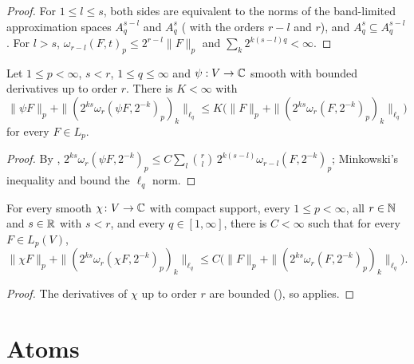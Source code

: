 \begin{proof}
\leanok
For $1 \leq l \leq s$, both sides are equivalent to the norms of the band-limited approximation
spaces $A^{s-l}_q$ and $A^s_q$ ( with the orders $r - l$ and $r$), and
$A^s_q \subseteq A^{s-l}_q$. For $l > s$, $\omega_{r-l}(F, t)_p \leq 2^{r-l} \|F\|_p$ and
$\sum_k 2^{k(s-l)q} < \infty$.
\end{proof}

\begin{theorem}
\label{thm:multipliers}
\leanok
{}
Let $1 \leq p < \infty$, $s < r$, $1 \leq q \leq \infty$ and $\psi : V \to \mathbb{C}$ smooth with bounded
derivatives up to order $r$. There is $K < \infty$ with
\[
  \|\psi F\|_p + \|(2^{ks} \omega_r(\psi F, 2^{-k})_p)_k\|_{\ell_q}
  \leq K \bigl( \|F\|_p + \|(2^{ks} \omega_r(F, 2^{-k})_p)_k\|_{\ell_q} \bigr)
\]
for every $F \in L_p$.
\end{theorem}

\begin{proof}
\leanok
By , $2^{ks} \omega_r(\psi F, 2^{-k})_p \leq C \sum_l \binom{r}{l} \,
2^{k(s-l)} \omega_{r-l}(F, 2^{-k})_p$; Minkowski's inequality and 
bound the $\ell_q$ norm.
\end{proof}

\begin{lemma}
\label{lem:besov-multiplier}
\leanok
{}
For every smooth $\chi \colon V \to \mathbb{C}$ with compact support, every $1 \leq p < \infty$, all
$r \in \mathbb{N}$ and $s \in \mathbb{R}$ with $s < r$, and every $q \in [1, \infty]$, there is $C < \infty$ such
that for every $F \in L_p(V)$,
\[
  \|\chi F\|_p + \|(2^{ks} \omega_r(\chi F, 2^{-k})_p)_k\|_{\ell_q}
  \leq C \bigl( \|F\|_p + \|(2^{ks} \omega_r(F, 2^{-k})_p)_k\|_{\ell_q} \bigr) .
\]
\end{lemma}

\begin{proof}
\leanok
The derivatives of $\chi$ up to order $r$ are bounded (), so
 applies.
\end{proof}

\section{Atoms}

